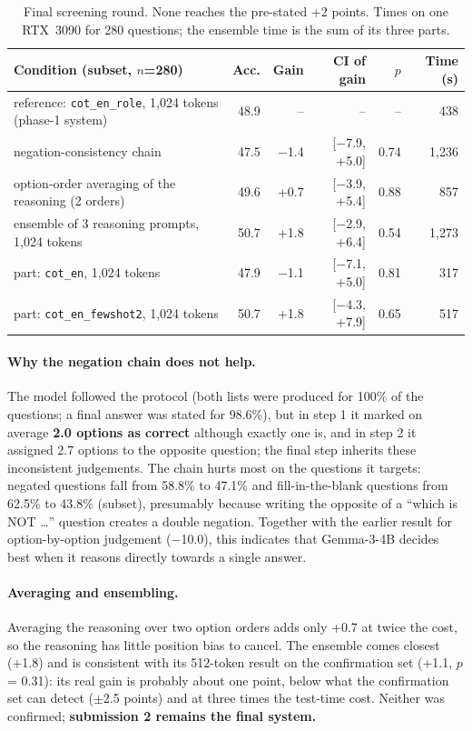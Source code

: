 \documentclass[10pt,a4paper]{article}
\newcommand{\cond}[1]{\texttt{#1}}
\begin{document}
\begin{table}[h]
\centering\footnotesize\setlength{\tabcolsep}{4pt}
\begin{tabular}{lrrrrr}
\toprule
Condition (subset, $n$=280) & Acc. & Gain & CI of gain & $p$ & Time (s)\\
\midrule
reference: \cond{cot\_en\_role}, 1,024 tokens (phase-1 system) & 48.9 & -- & -- & -- & 438\\
negation-consistency chain & 47.5 & $-$1.4 & [$-$7.9, +5.0] & 0.74 & 1,236\\
option-order averaging of the reasoning (2 orders) & 49.6 & +0.7 & [$-$3.9, +5.4] & 0.88 & 857\\
ensemble of 3 reasoning prompts, 1,024 tokens & 50.7 & +1.8 & [$-$2.9, +6.4] & 0.54 & 1,273\\
\quad part: \cond{cot\_en}, 1,024 tokens & 47.9 & $-$1.1 & [$-$7.1, +5.0] & 0.81 & 317\\
\quad part: \cond{cot\_en\_fewshot2}, 1,024 tokens & 50.7 & +1.8 & [$-$4.3, +7.9] & 0.65 & 517\\
\bottomrule
\end{tabular}
\caption{Final screening round. None reaches the pre-stated +2 points. Times on one RTX~3090 for 280 questions; the
ensemble time is the sum of its three parts.}
\label{tab:final_round}
\end{table}

\paragraph{Why the negation chain does not help.} The model followed the protocol (both lists were produced for
100\% of the questions; a final answer was stated for 98.6\%), but in step 1 it marked on average \textbf{2.0 options
as correct} although exactly one is, and in step 2 it assigned 2.7 options to the opposite question; the final step
inherits these inconsistent judgements. The chain hurts most on the questions it targets: negated questions fall from
58.8\% to 47.1\% and fill-in-the-blank questions from 62.5\% to 43.8\% (subset), presumably because writing the
opposite of a ``which is NOT \ldots'' question creates a double negation. Together with the earlier result for
option-by-option judgement ($-$10.0), this indicates that Gemma-3-4B decides best when it reasons directly towards a
single answer.

\paragraph{Averaging and ensembling.} Averaging the reasoning over two option orders adds only +0.7 at twice the
cost, so the reasoning has little position bias to cancel. The ensemble comes closest (+1.8) and is consistent with
its 512-token result on the confirmation set (+1.1, $p$ = 0.31): its real gain is probably about one point, below what
the confirmation set can detect ($\pm$2.5 points) and at three times the test-time cost. Neither was confirmed;
\textbf{submission 2 remains the final system.}
\end{document}

